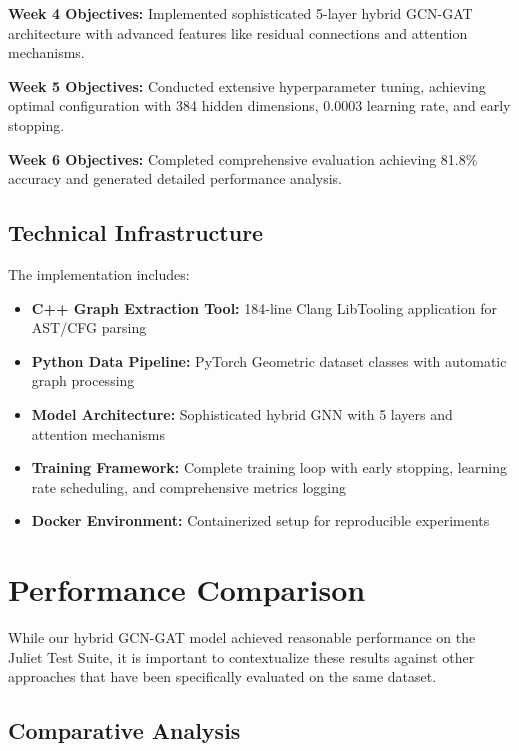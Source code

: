 \textbf{Week 4 Objectives:}  Implemented sophisticated 5-layer hybrid GCN-GAT architecture with advanced features like residual connections and attention mechanisms.

\textbf{Week 5 Objectives:}  Conducted extensive hyperparameter tuning, achieving optimal configuration with 384 hidden dimensions, 0.0003 learning rate, and early stopping.

\textbf{Week 6 Objectives:}  Completed comprehensive evaluation achieving 81.8\% accuracy and generated detailed performance analysis.

\subsection{Technical Infrastructure}

The implementation includes:
\begin{itemize}
\item \textbf{C++ Graph Extraction Tool:} 184-line Clang LibTooling application for AST/CFG parsing
\item \textbf{Python Data Pipeline:} PyTorch Geometric dataset classes with automatic graph processing  
\item \textbf{Model Architecture:} Sophisticated hybrid GNN with 5 layers and attention mechanisms
\item \textbf{Training Framework:} Complete training loop with early stopping, learning rate scheduling, and comprehensive metrics logging
\item \textbf{Docker Environment:} Containerized setup for reproducible experiments
\end{itemize}

\section{Performance Comparison}

While our hybrid GCN-GAT model achieved reasonable performance on the Juliet Test Suite, it is important to contextualize these results against other approaches that have been specifically evaluated on the same dataset.

\subsection{Comparative Analysis}

